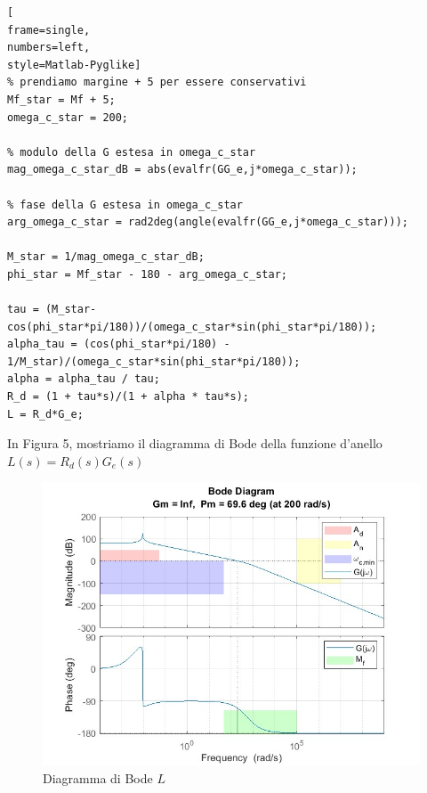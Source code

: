\documentclass[a4paper, 11pt]{article}
\begin{document}
\vspace{1cm}

\begin{lstlisting}[
frame=single,
numbers=left,
style=Matlab-Pyglike]
% prendiamo margine + 5 per essere conservativi
Mf_star = Mf + 5;
omega_c_star = 200;

% modulo della G estesa in omega_c_star
mag_omega_c_star_dB = abs(evalfr(GG_e,j*omega_c_star));

% fase della G estesa in omega_c_star
arg_omega_c_star = rad2deg(angle(evalfr(GG_e,j*omega_c_star)));

M_star = 1/mag_omega_c_star_dB;
phi_star = Mf_star - 180 - arg_omega_c_star;

tau = (M_star-cos(phi_star*pi/180))/(omega_c_star*sin(phi_star*pi/180));
alpha_tau = (cos(phi_star*pi/180) - 1/M_star)/(omega_c_star*sin(phi_star*pi/180));
alpha = alpha_tau / tau;
R_d = (1 + tau*s)/(1 + alpha * tau*s);
L = R_d*G_e;
\end{lstlisting}

\vspace{1 cm}

In Figura 5, mostriamo il diagramma di Bode della funzione d'anello $L(s) = R_d(s) G_e(s)$

\begin{figure} [!h]
    \centering
    \includegraphics[scale = 0.55]{Immagini/BODE/bode_N_P.jpg}
    \caption{Diagramma di Bode $L$}
    \label{fig:enter-label}
\end{figure}

\vspace{5cm}
\end{document}
